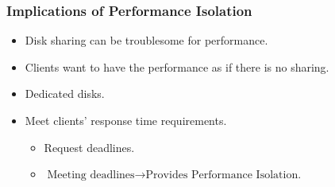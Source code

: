 \documentclass{beamer}
\newcommand{\myv}{\vspace{3 mm}}
\begin{document}
\begin{frame}
  \frametitle{Implications of Performance Isolation}
  \begin{itemize}
  \item Disk sharing can be troublesome for performance.
    \myv
  \item Clients want to have the performance as if there is no sharing.
    \vspace{-2.5 mm}
  \item Dedicated disks.
    \myv
  \item Meet clients' response time requirements.
    \begin{itemize}
      \myv
      \item Request deadlines.
        \myv
      \item \(\text{Meeting deadlines} \rightarrow \text{Provides Performance Isolation.}\)
    \end{itemize}
  \end{itemize}
\end{frame}
\end{document}
